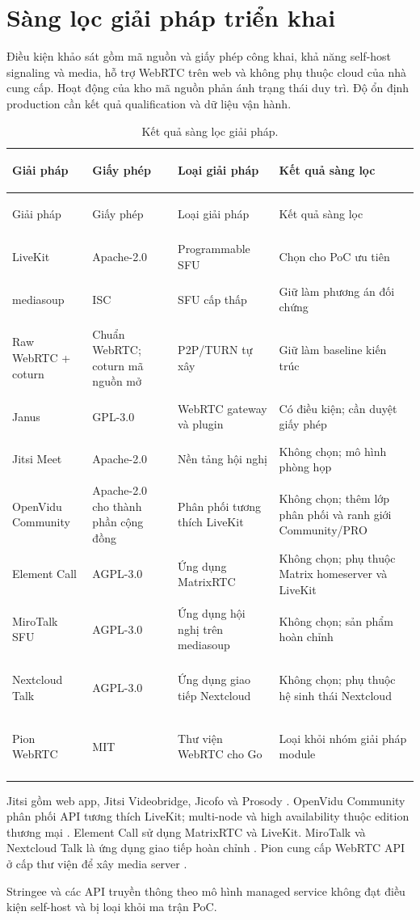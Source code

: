 \section{Sàng lọc giải pháp triển khai}

Điều kiện khảo sát gồm mã nguồn và giấy phép công khai, khả năng self-host signaling và
media, hỗ trợ WebRTC trên web và không phụ thuộc cloud của nhà cung cấp. Hoạt động của
kho mã nguồn phản ánh trạng thái duy trì. Độ ổn định production cần kết quả qualification
và dữ liệu vận hành.

\begin{longtable}{|>{\bfseries\raggedright\arraybackslash}p{}|>{\raggedright\arraybackslash}p{}|>{\raggedright\arraybackslash}p{}|>{\raggedright\arraybackslash}p{}|}
\hline
Giải pháp & Giấy phép & Loại giải pháp & Kết quả sàng lọc \\
\hline
\endfirsthead
\hline
Giải pháp & Giấy phép & Loại giải pháp & Kết quả sàng lọc \\
\hline
\endhead
LiveKit & Apache-2.0 & Programmable SFU & Chọn cho PoC ưu tiên \\
\hline
mediasoup & ISC & SFU cấp thấp & Giữ làm phương án đối chứng \\
\hline
Raw WebRTC + coturn & Chuẩn WebRTC; coturn mã nguồn mở & P2P/TURN tự xây & Giữ làm baseline kiến trúc \\
\hline
Janus & GPL-3.0 & WebRTC gateway và plugin & Có điều kiện; cần duyệt giấy phép \\
\hline
Jitsi Meet & Apache-2.0 & Nền tảng hội nghị & Không chọn; mô hình phòng họp \\
\hline
OpenVidu Community & Apache-2.0 cho thành phần cộng đồng & Phân phối tương thích LiveKit & Không chọn; thêm lớp phân phối và ranh giới Community/PRO \\
\hline
Element Call & AGPL-3.0 & Ứng dụng MatrixRTC & Không chọn; phụ thuộc Matrix homeserver và LiveKit \\
\hline
MiroTalk SFU & AGPL-3.0 & Ứng dụng hội nghị trên mediasoup & Không chọn; sản phẩm hoàn chỉnh \\
\hline
Nextcloud Talk & AGPL-3.0 & Ứng dụng giao tiếp Nextcloud & Không chọn; phụ thuộc hệ sinh thái Nextcloud \\
\hline
Pion WebRTC & MIT & Thư viện WebRTC cho Go & Loại khỏi nhóm giải pháp module \\
\hline
\caption{Kết quả sàng lọc giải pháp.}
\label{tab:solution-screening}
\end{longtable}

Jitsi gồm web app, Jitsi Videobridge, Jicofo và Prosody
\cite{jitsi-repo,jitsi-architecture}. OpenVidu Community phân phối API tương thích
LiveKit; multi-node và high availability thuộc edition thương mại
\cite{openvidu-docs}. Element Call sử dụng MatrixRTC và LiveKit. MiroTalk và Nextcloud
Talk là ứng dụng giao tiếp hoàn chỉnh \cite{element-call,mirotalk,nextcloud-talk}. Pion
cung cấp WebRTC API ở cấp thư viện để xây media server \cite{pion-repo}.

Stringee và các API truyền thông theo mô hình managed service không đạt điều kiện
self-host và bị loại khỏi ma trận PoC.
